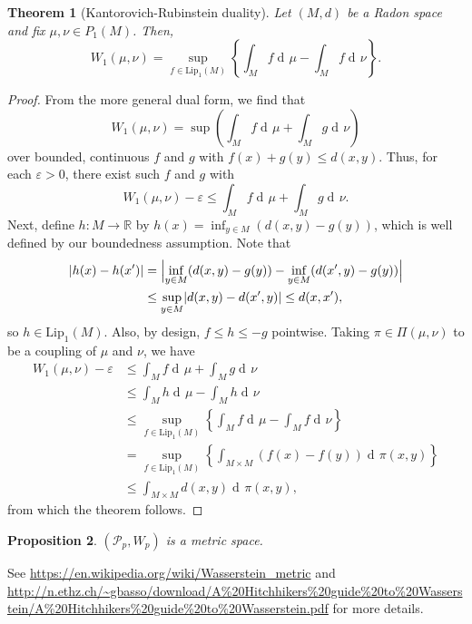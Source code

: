 \documentclass{article}
\newtheorem{theorem}{Theorem}
\newtheorem{proposition}[theorem]{Proposition}
\newcommand{\dd}{\mathop{\mathrm{d}\!}}
\newcommand{\R}{\mathbb{R}}
\newcommand{\Lip}{\mathrm{Lip}}
\renewcommand{\P}{\mathcal{P}}
\DeclarePairedDelimiter{\abs}{\lvert}{\rvert}
\begin{document}
\begin{theorem}[Kantorovich-Rubinstein duality]
    Let $(M,d)$ be a Radon space and fix $\mu,\nu \in P_1(M)$. Then,
    \begin{equation*}
        W_1(\mu,\nu) = \sup_{f \in \Lip_1(M)}\left\{\int_M f \dd\mu - \int_M f \dd\nu \right\}.
    \end{equation*}
\end{theorem}
\begin{proof}
    From the more general dual form, we find that
    \begin{equation*}
        W_1(\mu,\nu) = \sup\left(\int_M f \dd \mu + \int_M g \dd \nu\right)
    \end{equation*}
    over bounded, continuous $f$ and $g$ with $f(x) + g(y) \leq d(x,y)$. Thus, for each $\varepsilon > 0$, there exist such $f$ and $g$ with
    \begin{equation*}
        W_1(\mu,\nu) - \varepsilon \leq \int_M f \dd\mu + \int_M g \dd\nu.
    \end{equation*}
    Next, define $h:M \to \R$ by $h(x) = \inf_{y \in M}(d(x,y) - g(y))$, which is well defined by our boundedness assumption. Note that
    \begin{align*}
        \abs{h(x) - h(x')} &= \abs[\Big]{\inf_{y \in M}(d(x,y) - g(y)) - \inf_{y \in M}(d(x',y) - g(y))}\\
        &\leq \sup_{y \in M} \abs{d(x,y) - d(x',y)} \leq d(x,x'),
    \end{align*}
    so $h \in \Lip_1(M)$. Also, by design, $f \leq h \leq -g$ pointwise. Taking $\pi \in \Pi(\mu,\nu)$ to be a coupling of $\mu$ and $\nu$, we have
    \begin{align*}
        W_1(\mu,\nu) - \varepsilon &\leq \int_M f \dd\mu + \int_M g \dd\nu\\
        &\leq \int_M h \dd\mu - \int_M h \dd\nu\\
        &\leq \sup_{f \in \Lip_1(M)} \left\{\int_M f \dd\mu - \int_M f \dd\nu\right\}\\
        &=  \sup_{f \in \Lip_1(M)} \left\{\int_{M \times M} (f(x) - f(y)) \dd\pi(x,y)\right\}\\
        &\leq \int_{M \times M} d(x,y) \dd\pi(x,y),
    \end{align*}
    from which the theorem follows.
\end{proof}

\begin{proposition}
$(\P_p, W_p)$ is a metric space.
\end{proposition}
See \url{https://en.wikipedia.org/wiki/Wasserstein_metric} and \url{http://n.ethz.ch/~gbasso/download/A%20Hitchhikers%20guide%20to%20Wasserstein/A%20Hitchhikers%20guide%20to%20Wasserstein.pdf} for more details.
\end{document}
